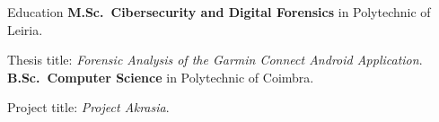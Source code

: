 \begin{rubric}{Education}
\entry*[2021 -- 2023]%
	\textbf{M.Sc.~Cibersecurity and Digital Forensics} in Polytechnic of Leiria.\par
	Thesis title: \emph{Forensic Analysis of the Garmin Connect Android Application}.
% 
\entry*[2018 -- 2021]%
	\textbf{B.Sc.~Computer Science} in Polytechnic of Coimbra.\par
	Project title: \emph{Project Akrasia}.
\end{rubric}
